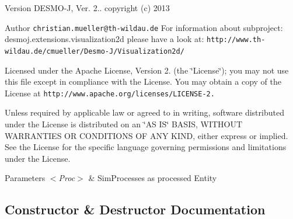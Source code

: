 \begin{DoxyVersion}{Version}
D\-E\-S\-M\-O-\/\-J, Ver. 2.. copyright (c) 2013 
\end{DoxyVersion}
\begin{DoxyAuthor}{Author}
{\tt christian.\-mueller@th-\/wildau.\-de} For information about subproject\-: desmoj.\-extensions.\-visualization2d please have a look at\-: {\tt http\-://www.\-th-\/wildau.\-de/cmueller/\-Desmo-\/\-J/\-Visualization2d/}
\end{DoxyAuthor}
Licensed under the Apache License, Version 2. (the \char`\"{}\-License\char`\"{}); you may not use this file except in compliance with the License. You may obtain a copy of the License at {\tt http\-://www.\-apache.\-org/licenses/\-L\-I\-C\-E\-N\-S\-E-\/2.}

Unless required by applicable law or agreed to in writing, software distributed under the License is distributed on an \char`\"{}\-A\-S I\-S\char`\"{} B\-A\-S\-I\-S, W\-I\-T\-H\-O\-U\-T W\-A\-R\-R\-A\-N\-T\-I\-E\-S O\-R C\-O\-N\-D\-I\-T\-I\-O\-N\-S O\-F A\-N\-Y K\-I\-N\-D, either express or implied. See the License for the specific language governing permissions and limitations under the License.


\begin{DoxyParams}{Parameters}
{\em $<$\-Proc$>$} & Sim\-Processes as processed Entity \\
\hline
\end{DoxyParams}


\subsection{Constructor \& Destructor Documentation}
